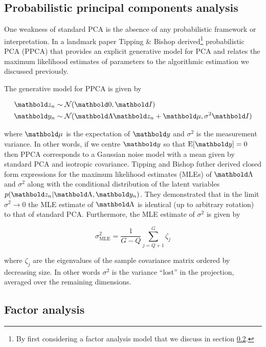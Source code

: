 \subsection{Probabilistic principal components analysis}

One weakness of standard PCA is the absence of any probabilistic framework or interpretation. In a landmark paper \cite{tipping1999probabilistic} Tipping \& Bishop derived\footnote{By first considering a factor analysis model that we discuss in section \ref{sec:intr:fa}.} probabilistic PCA (PPCA) that provides an explicit generative model for PCA and relates the maximum likelihood estimates of parameters to the algorithmic estimation we discussed previously.

The generative model for PPCA is given by

\begin{equation}
  \begin{aligned}
    \mbz_n & \sim \Norm(\mbzero, \mbI) \\
    \mby_n & \sim \Norm(\mbLambda \mbz_n + \mbmu, \sigma^2 \mbI)
  \end{aligned}
\end{equation}

where $\mbmu$ is the expectation of $\mby$ and $\sigma^2$ is the measurement variance. In other words, if we centre $\mby$ so that $\text{E}[\mby] = 0$ then PPCA corresponds to a Gaussian noise model with a mean given by standard PCA and isotropic covariance. Tipping and Bishop futher derived closed form expressions for the maximum likelihood estimates (MLEs) of $\mbLambda$ and $\sigma^2$ along with the conditional distribution of the latent variables $p(\mbz_n | \mbLambda, \mby_n)$. They demonstrated that in the limit $\sigma^2 \rightarrow 0$ the MLE estimate of $\mbLambda$ is identical (up to arbitrary rotation) to that of standard PCA. Furthermore, the MLE estimate of $\sigma^2$ is given by

\begin{equation}
  \sigma^2_{\text{MLE}} = \frac{1}{G-Q} \sum_{j = Q + 1}^G \zeta_j
\end{equation}

where $\zeta_j$ are the eigenvalues of the sample covariance matrix ordered by decreasing size. In other words $\sigma^2$ is the variance ``lost'' in the projection, averaged over the remaining dimensions.

\subsection{Factor analysis} \label{sec:intr:fa}

